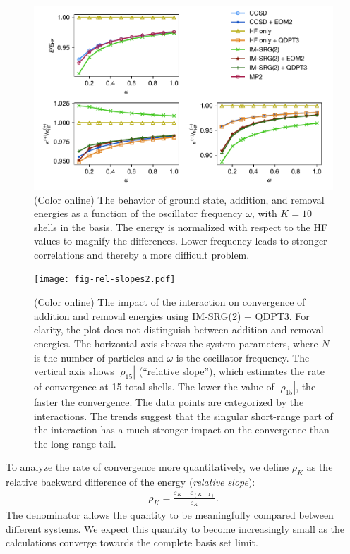\documentclass[aip, jcp, 12pt]{revtex4-1}
\begin{document}
\begin{figure}
  \centering
  \includegraphics{fig-by-freq-10-6-normal.pdf}
  \caption{(Color online) The behavior of ground state, addition, and removal energies as a function of the oscillator frequency $\omega$, with $K = 10$ shells in the basis.  The energy is normalized with respect to the HF values to magnify the differences.  Lower frequency leads to stronger correlations and thereby a more difficult problem.}
  \label{fig:by-freq-10-6-normal}
\end{figure}

\begin{figure}
  \centering
  \texttt{[image: fig-rel-slopes2.pdf]}
  \caption{(Color online) The impact of the interaction on convergence of addition and removal energies using IM-SRG(2) + QDPT3.  For clarity, the plot does not distinguish between addition and removal energies.  The horizontal axis shows the system parameters, where $N$ is the number of particles and $\omega$ is the oscillator frequency.  The vertical axis shows $|\rho_{15}|$ (``relative slope''), which estimates the rate of convergence at 15 total shells.  The lower the value of $|\rho_{15}|$, the faster the convergence.  The data points are categorized by the interactions.  The trends suggest that the singular short-range part of the interaction has a much stronger impact on the convergence than the long-range tail.}
  \label{fig:rel-slopes}
\end{figure}

To analyze the rate of convergence more quantitatively, we define $\rho_K$ as the relative backward difference of the energy (\textit{relative slope}):
\begin{align*}
  \rho_K = \frac{\varepsilon_K - \varepsilon_{(K - 1)}}{\varepsilon_K}.
\end{align*}
The denominator allows the quantity to be meaningfully compared between different systems.  We expect this quantity to become increasingly small as the calculations converge towards the complete basis set limit.
\end{document}
